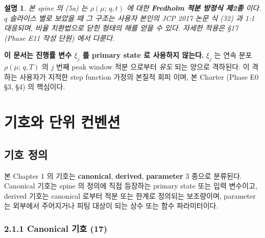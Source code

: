 \documentclass[11pt,a4paper]{article}
\newtheorem*{note}{설명}
\newcommand{\mucont}{\mu}
\newcommand{\rhomu}{\rho(\mucont;\, q, T)}
\newcommand{\rhomut}{\rho(\mucont;\, q, t)}
\begin{document}
\begin{note}
본 spine 의 (5a) 는 $\rhomut$ 에 대한 \textbf{Fredholm 적분 방정식 제2종} 이다.
$q$ 슬라이스 별로 보았을 때 그 구조는 사용자 본인의 JCP 2017 논문 식 (32) 과
1:1 대응되며, 비율 치환법으로 닫힌 형태의 해를 얻을 수 있다. 자세한 적용은
\S 17 (Phase E11 작성 단원) 에서 다룬다.
\end{note}

\begin{mdframed}
\textbf{이 문서는 진행률 변수 $\xi_j$ 를 primary state 로 사용하지 않는다.}
$\xi_j$ 는 연속 분포 $\rhomu$ 의 $j$ 번째 peak window 적분 으로부터 \emph{유도}
되는 양으로 격하된다. 이 격하는 사용자가 지적한 step function 가정의 본질적 회피
이며, 본 Charter (Phase E0 §3, §4) 의 핵심이다.
\end{mdframed}

\section{기호와 단위 컨벤션}

\subsection{기호 정의}
\label{sec:symbols}

본 Chapter 1 의 기호는 \textbf{canonical}, \textbf{derived}, \textbf{parameter}
3 종으로 분류된다. Canonical 기호는 spine 의 정의에 직접 등장하는 primary state
또는 입력 변수이고, derived 기호는 canonical 로부터 적분 또는 한계로 정의되는
보조량이며, parameter 는 외부에서 주어지거나 피팅 대상이 되는 상수 또는 함수
파라미터이다.

\subsubsection*{2.1.1 Canonical 기호 (17)}
\end{document}
